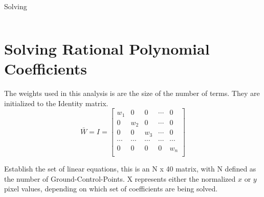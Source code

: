 \documentclass[10pt]{report}
\begin{document}
Solving

\begin{equation}

\end{equation}

\chapter*{Solving Rational Polynomial Coefficients}

The weights used in this analysis is are the size of the number of terms. They are
initialized to the Identity matrix.
\begin{equation}
\bar{W} = I = 
\begin{bmatrix}
  w_1  &    0   &    0   & \cdots & 0 \\
   0   &   w_2  &    0   & \cdots & 0 \\
   0   &    0   &   w_3  & \cdots & 0 \\
\cdots & \cdots & \cdots & \cdots &  \cdots \\
   0   &    0   &    0   &    0   &  w_n  \\
\end{bmatrix}
\end{equation}

Establish the set of linear equations, this is an N x 40 matrix, 
with N defined as the number of Ground-Control-Points. 
X represents either the normalized $x$ or $y$ pixel values,
depending on which set of coefficients are being solved.
\end{document}
